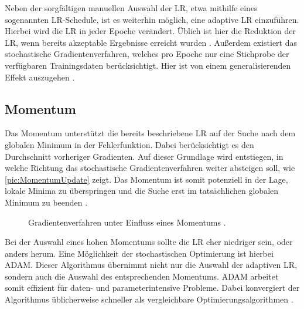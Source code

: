 \noindent
Neben der sorgfältigen manuellen Auswahl der \ac{LR}, etwa mithilfe eines sogenannten \ac{LR}-Schedule, ist es weiterhin möglich, eine adaptive \ac{LR} einzuführen. Hierbei wird die \ac{LR} in jeder Epoche verändert. Üblich ist hier die Reduktion der \ac{LR}, wenn bereits akzeptable Ergebnisse erreicht wurden \cite[S.~433]{ZHA20}. Außerdem existiert das stochastische Gradientenverfahren, welches pro Epoche nur eine Stichprobe der verfügbaren Trainingsdaten berücksichtigt. Hier ist von einem generalisierenden Effekt auszugehen \cite[S.~437]{ZHA20}.


\subsection{Momentum}
\noindent
Das Momentum unterstützt die bereits beschriebene \ac{LR} auf der Suche nach dem globalen Minimum in der Fehlerfunktion. Dabei berücksichtigt es den Durchschnitt vorheriger Gradienten. Auf dieser Grundlage wird entstiegen, in welche Richtung das stochastische Gradientenverfahren weiter absteigen soll, wie \autoref{pic:MomentumUpdate} zeigt. Das Momentum ist somit potenziell in der Lage, lokale Minima zu überspringen und die Suche erst im tatsächlichen globalen Minimum zu beenden \cite[S.~453-456]{ZHA20}.

\begin{figure}[h!]
  \centering
  \caption{Gradientenverfahren unter Einfluss eines Momentums \cite{CSNOJ}.}
  \label{pic:MomentumUpdate}
\end{figure}

\noindent
Bei der Auswahl eines hohen Momentums sollte die \ac{LR} eher niedriger sein, oder anders herum. Eine Möglichkeit der stochastischen Optimierung ist hierbei \ac{ADAM}. Dieser Algorithmus übernimmt nicht nur die Auswahl der adaptiven \ac{LR}, sondern auch die Auswahl des entsprechenden Momentums. \ac{ADAM} arbeitet somit effizient für daten- und parameterintensive Probleme. Dabei konvergiert der Algorithmus üblicherweise schneller als vergleichbare Optimierungsalgorithmen \cite[S.~1-2]{KIN17}.


